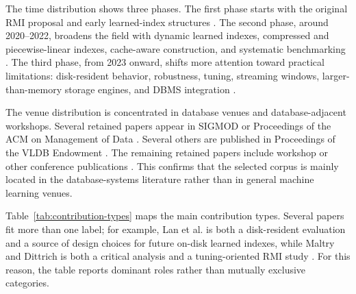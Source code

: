 \documentclass[a4paper, 12pt, twoside]{report}
\begin{document}
The time distribution shows three phases. The first phase starts with the original RMI proposal and early learned-index structures \cite{kraska2018,galakatos2019fiting}. The second phase, around 2020--2022, broadens the field with dynamic learned indexes, compressed and piecewise-linear indexes, cache-aware construction, and systematic benchmarking \cite{ding2020alex,ferragina2020pgm,kipf2020radixspline,marcus2020benchmarking,zhang2022carmi,wongkham2022ready,maltry2022critical}. The third phase, from 2023 onward, shifts more attention toward practical limitations: disk-resident behavior, robustness, tuning, streaming windows, larger-than-memory storage engines, and DBMS integration \cite{lan2023disk,sun2023learned,li2023dili,maharjan2023learnedstore,liang2024swix,chatterjee2024limousine,wang2025tuning,luo2025robustness,fuad2026postlearn}.

The venue distribution is concentrated in database venues and database-adjacent workshops. Several retained papers appear in SIGMOD or Proceedings of the ACM on Management of Data \cite{kraska2018,galakatos2019fiting,ding2020alex,lan2023disk,liang2024swix,chatterjee2024limousine,wang2025tuning,luo2025robustness}. Several others are published in Proceedings of the VLDB Endowment \cite{marcus2020benchmarking,ferragina2020pgm,maltry2022critical,zhang2022carmi,wongkham2022ready,sun2023learned,li2023dili}. The remaining retained papers include workshop or other conference publications \cite{kipf2020radixspline,maharjan2023learnedstore,fuad2026postlearn}. This confirms that the selected corpus is mainly located in the database-systems literature rather than in general machine learning venues.

Table~\ref{tab:contribution-types} maps the main contribution types. Several papers fit more than one label; for example, Lan et al. is both a disk-resident evaluation and a source of design choices for future on-disk learned indexes, while Maltry and Dittrich is both a critical analysis and a tuning-oriented RMI study \cite{lan2023disk,maltry2022critical}. For this reason, the table reports dominant roles rather than mutually exclusive categories.
\end{document}

